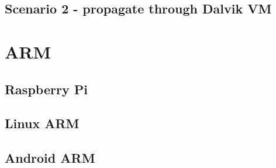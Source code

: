 \subsection{Scenario 2 - propagate through Dalvik VM}

\section{ARM}
\subsection{Raspberry Pi}
\subsection{Linux ARM}
\subsection{Android ARM}

